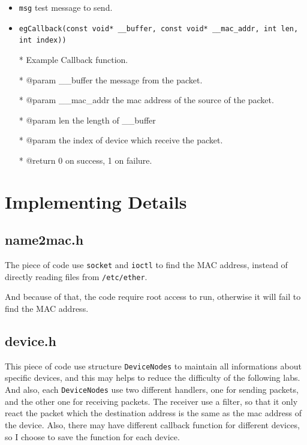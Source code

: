 \documentclass[11pt]{article}
\begin{document}
	\begin{itemize}
		\item \texttt{msg} test message to send.
		
		\item \texttt{egCallback(const void* \_\_buffer, const void* \_\_mac\_addr, int len, int index))}
		
		* Example Callback function.
		
		* @param \_\_buffer the message from the packet.
		
		* @param \_\_mac\_addr the mac address of the source of the packet.
		
		* @param len the length of \_\_buffer
		
		* @param the index of device which receive the packet.
		
		* @return 0 on success, 1 on failure.
	\end{itemize}
		
		
		
	\section{Implementing Details}
	
	\subsection*{name2mac.h}
	
	\par The piece of code use \texttt{socket} and \texttt{ioctl} to find the MAC address, instead of directly reading files from \texttt{/etc/ether}. 
	
	\par And because of that, the code require root access to run, otherwise it will fail to find the MAC address.
	
	\subsection*{device.h}
	
	\par This piece of code use structure \texttt{DeviceNodes} to maintain all informations about specific devices, and this may helps to reduce the difficulty of the following labs. And also, each \texttt{DeviceNodes} use two different handlers, one for sending packets, and the other one for receiving packets. The receiver use a filter, so that it only react the packet which the destination address is the same as the mac address of the device. Also, there may have different callback function for different devices, so I choose to save the function for each device.
	
\end{document}
